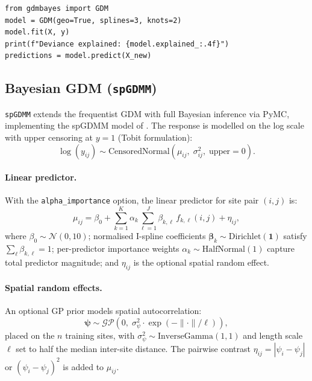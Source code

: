 \documentclass[12pt,a4paper]{article}
\begin{document}
\begin{lstlisting}[style=python]
from gdmbayes import GDM
model = GDM(geo=True, splines=3, knots=2)
model.fit(X, y)
print(f"Deviance explained: {model.explained_:.4f}")
predictions = model.predict(X_new)
\end{lstlisting}

\subsection{Bayesian GDM (\texttt{spGDMM})}\label{sec:bayes}

\texttt{spGDMM} extends the frequentist GDM with full Bayesian inference via
PyMC, implementing the spGDMM model of \citet{white2024}. The response is
modelled on the log scale with upper censoring at $y = 1$ (Tobit formulation):
\begin{equation}
  \log(y_{ij}) \sim
  \mathrm{CensoredNormal}\!\left(\mu_{ij},\;\sigma^2_{ij},\;\text{upper}=0\right).
  \label{eq:likelihood}
\end{equation}

\paragraph{Linear predictor.}
With the \texttt{alpha\_importance} option, the linear predictor for site pair
$(i,j)$ is:
\begin{equation}
  \mu_{ij} = \beta_0
  + \sum_{k=1}^{K} \alpha_k \sum_{\ell=1}^{J} \beta_{k,\ell}\, f_{k,\ell}(i,j)
  + \eta_{ij},
  \label{eq:linear-predictor}
\end{equation}
where $\beta_0 \sim \mathcal{N}(0, 10)$; normalised I-spline coefficients
$\boldsymbol{\beta}_k \sim \mathrm{Dirichlet}(\mathbf{1})$ satisfy
$\sum_\ell \beta_{k,\ell} = 1$; per-predictor importance weights
$\alpha_k \sim \mathrm{HalfNormal}(1)$ capture total predictor magnitude; and
$\eta_{ij}$ is the optional spatial random effect.

\paragraph{Spatial random effects.}
An optional GP prior models spatial autocorrelation:
\begin{equation}
  \boldsymbol{\psi} \sim
  \mathcal{GP}\!\left(0,\;\sigma^2_\psi \cdot
  \exp\!\left(-\|\cdot\| / \ell\right)\right),
  \label{eq:gp-prior}
\end{equation}
placed on the $n$ training sites, with $\sigma^2_\psi \sim
\mathrm{InverseGamma}(1,1)$ and length scale $\ell$ set to half the median
inter-site distance. The pairwise contrast $\eta_{ij} = |\psi_i - \psi_j|$
or $(\psi_i - \psi_j)^2$ is added to $\mu_{ij}$.
\end{document}
